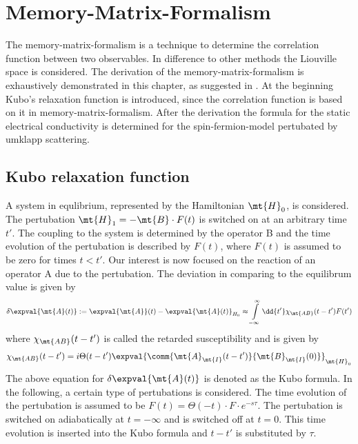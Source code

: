%
%
%
\chapter{Memory-Matrix-Formalism}
\label{ch:memory matrix formalism} 
%
%
%
The memory-matrix-formalism is a technique to determine the correlation function between two observables.
In difference to other methods the Liouville space is considered.
The derivation of the memory-matrix-formalism is exhaustively demonstrated in this chapter, as suggested in \cite{Forster}.
At the beginning Kubo's relaxation function is introduced, since the correlation function is based on it in memory-matrix-formalism.
After the derivation the formula for the static electrical conductivity is determined for the spin-fermion-model pertubated by umklapp scattering.
%
%
\section{Kubo relaxation function}
\label{sec:kubo relaxation function}
%
%
A system in equlibrium, represented by the Hamiltonian $\mt{H}_{0}$, is considered.
The pertubation $\mt{H}_{1} = -\mt{B} \cdot F(t)$ is switched on at an arbitrary time $t'$.
The coupling to the system is determined by the operator B and the time evolution of the pertubation is described by $F(t)$, where $F(t)$ is assumed to be zero for times $t<t'$.
Our interest is now focused on the reaction of an operator A due to the pertubation.
The deviation in comparing to the equilibrum value is given by
%
\begin{align}
	\delta\expval{\mt{A}(t)} := \expval{\mt{A}}(t) - \expval{\mt{A}(t)}_{H_{0}} \approx \int\limits_{-\infty}^{\infty} \dd{t'} \chi_{\mt{AB}}(t-t') F(t')
	\label{eq:{eq:Kubo formula}}
\end{align}
%
where $\chi_{\mt{AB}}(t-t')$ is called the retarded susceptibility and is given by
%
\begin{align}
	\chi_{\mt{AB}}(t-t') = i \Theta(t-t') \expval{\comm{\mt{A}_{\mt{I}}(t-t')}{\mt{B}_{\mt{I}}(0)}}_{\mt{H}_{0}}
	\label{eq:dynamical susceptibilty}
\end{align}
% 
The above equation for $\delta\expval{\mt{A}(t)}$ is denoted as the Kubo formula.
In the following, a certain type of pertubations is considered.
The time evolution of the pertubation is assumed to be $F(t) = \Theta(-t) \cdot F \cdot e^{-s\tau}$.
The pertubation is switched on adiabatically at $t = -\infty$ and is switched off at $t=0$.
This time evolution is inserted into the Kubo formula and $t-t'$ is substituted by $\tau$.
